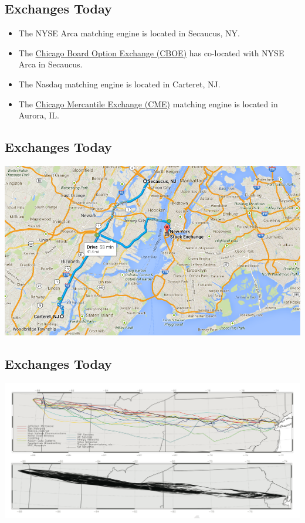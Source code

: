 \documentclass[letterpaper,10pt,english]{sphinxmanual}
\begin{document}
\subsection{Exchanges Today}
\label{trading:id3}\begin{itemize}
\item {} 
The NYSE Arca matching engine is located in Secaucus, NY.

\end{itemize}
\begin{itemize}
\item {} 
The \href{http://en.wikipedia.org/wiki/Chicago\_Board\_Options\_Exchange}{Chicago Board Option Exchange (CBOE)} has
co-located with NYSE Arca in Secaucus.

\end{itemize}
\begin{itemize}
\item {} 
The Nasdaq matching engine is located in Carteret, NJ.

\end{itemize}
\begin{itemize}
\item {} 
The \href{http://en.wikipedia.org/wiki/CME\_Group}{Chicago Mercantile Exchange (CME)} matching engine is
located in Aurora, IL.

\end{itemize}


\subsection{Exchanges Today}
\label{trading:id4}
\includegraphics[width=6in]{exchangeMap.png}


\subsection{Exchanges Today}
\label{trading:id5}
\includegraphics[width=6in]{microwave.png}
\end{document}
